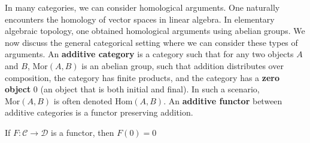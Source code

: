 In many categories, we can consider homological arguments. One naturally encounters the homology of vector spaces in linear algebra. In elementary algebraic topology, one obtained homological arguments using abelian groups. We now discuss the general categorical setting where we can consider these types of arguments. An {\bf additive category} is a category such that for any two objects $A$ and $B$, $\text{Mor}(A,B)$ is an abelian group, such that addition distributes over composition, the category has finite products, and the category has a {\bf zero object} $0$ (an object that is both initial and final). In such a scenario, $\text{Mor}(A,B)$ is often denoted $\text{Hom}(A,B)$. An {\bf additive functor} between additive categories is a functor preserving addition.

\begin{theorem}
    If $F: \mathcal{C} \to \mathcal{D}$ is a functor, then $F(0) = 0$
\end{theorem}

